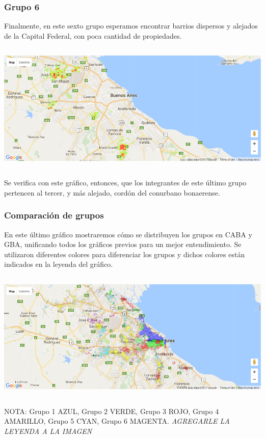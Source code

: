 \documentclass[a4paper, 10pt]{article}
\newcommand\tab[1][0.5cm]{\hspace*{#1}}
\begin{document}
				\subsubsection{Grupo 6}
					Finalmente, en este sexto grupo esperamos encontrar barrios dispersos y alejados de la Capital Federal, con poca
					cantidad de propiedades.
					\begin{center}
						\includegraphics[width=6in, height=2.46in]{images/m2Group6HeatMap}
				  	\end{center}
				  	\tab Se verifica con este gráfico, entonces, que los integrantes de este último grupo pertencen al tercer,
				  	y más alejado, cordón del conurbano bonaerense.
				\subsubsection{Comparación de grupos}
					En este último gráfico mostraremos cómo se distribuyen los grupos en CABA y GBA, unificando todos los gráficos
					previos para un mejor entendimiento. Se utilizaron diferentes colores para diferenciar los grupos y dichos
					colores están indicados en la leyenda del gráfico.
					\begin{center}
						\includegraphics[width=6in, height=2.46in]{images/m2GroupComparison}
				  	\end{center}
				  	\tab NOTA: Grupo 1 AZUL, Grupo 2 VERDE, Grupo 3 ROJO, Grupo 4 AMARILLO, Grupo 5 CYAN, Grupo 6 MAGENTA.
				  	\emph{AGREGARLE LA LEYENDA A LA IMAGEN}
\end{document}
